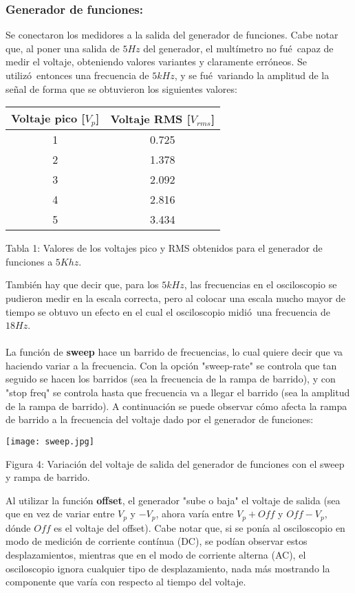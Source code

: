 \documentclass{article}
\begin{document}
\subsubsection*{Generador de funciones:}
Se conectaron los medidores a la salida del generador de funciones. Cabe notar que, al poner una salida de $5Hz$ del generador, el mult\'imetro no fu\'e\ capaz de medir el voltaje, obteniendo valores variantes y claramente err\'oneos. Se utiliz\'o\ entonces una frecuencia de $5kHz$, y se fu\'e\ variando la amplitud de la se\~nal de forma que se obtuvieron los siguientes valores:
\begin{center}
\begin{tabular}{||c|c||}
\hline
Voltaje pico [$V_p$] & Voltaje RMS [$V_{rms}$] \\ \hline
1 & 0.725 \\ \hline
2 & 1.378 \\ \hline
3 & 2.092 \\ \hline
4 & 2.816 \\ \hline
5 & 3.434 \\ \hline

\end{tabular}
\end{center}
\begin{center}
Tabla 1: Valores de los voltajes pico y RMS obtenidos para el generador de funciones a $5Khz$.
\end{center}
Tambi\'en hay que decir que, para los $5kHz$, las frecuencias en el osciloscopio se pudieron medir en la escala correcta, pero al colocar una escala mucho mayor de tiempo se obtuvo un efecto en el cual el osciloscopio midi\'o\ una frecuencia de $18Hz$. \\ \\
La funci\'on de \textbf{sweep} hace un barrido de frecuencias, lo cual quiere decir que va haciendo variar a la frecuencia. Con la opci\'on "sweep-rate" se controla que tan seguido se hacen los barridos (sea la frecuencia de la rampa de barrido), y con "stop freq" se controla hasta que frecuencia va a llegar el barrido (sea la amplitud de la rampa de barrido). A continuaci\'on se puede observar c\'omo afecta la rampa de barrido a la frecuencia del voltaje dado por el generador de funciones:
\begin{center}
\texttt{[image: sweep.jpg]}
\end{center}
\begin{center}
Figura 4: Variaci\'on del voltaje de salida del generador de funciones con el sweep y rampa de barrido.
\end{center}
Al utilizar la funci\'on \textbf{offset}, el generador "sube o baja" el voltaje de salida (sea que en vez de variar entre $V_p$ y $-V_p$, ahora var\'ia entre $V_p+Off$ y $Off-V_p$, d\'onde $Off$ es el voltaje del offset). Cabe notar que, si se pon\'ia al osciloscopio en modo de medici\'on de corriente cont\'inua (DC), se pod\'ian observar estos desplazamientos, mientras que en el modo de corriente alterna (AC), el osciloscopio ignora cualquier tipo de desplazamiento, nada m\'as mostrando la componente que var\'ia con respecto al tiempo del voltaje.
\end{document}
